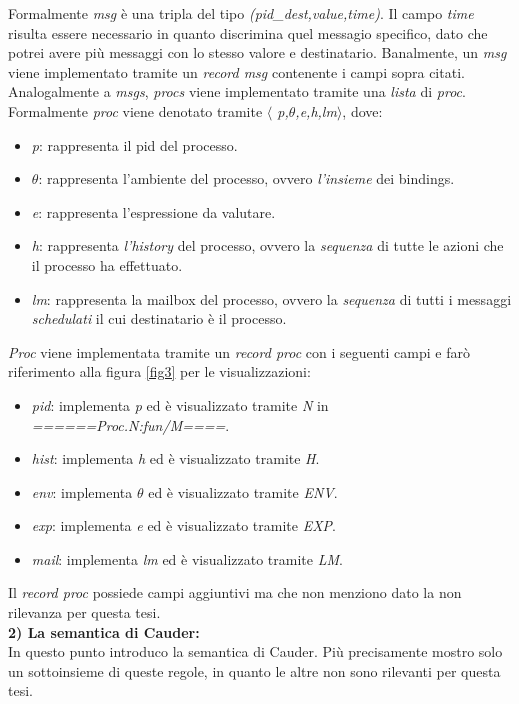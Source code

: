 \documentclass[background.tex]{subfiles}
\begin{document}
Formalmente \textit{msg} è una tripla del tipo \textit{(pid\_dest,value,time)}. Il campo \textit{time} risulta essere necessario in quanto discrimina quel messagio specifico, dato che potrei avere più messaggi con lo stesso valore e destinatario.
Banalmente, un \textit{msg} viene implementato tramite un \textit{record msg} contenente i campi sopra citati.
Analogalmente a \textit{msgs}, \textit{procs} viene implementato tramite una \textit{lista} di \textit{proc}.
Formalmente \textit{proc} viene denotato tramite \textit{$\langle$ p,$\theta$,e,h,lm$\rangle$}, dove:
	\begin{itemize}
		\item \textit{p}: rappresenta il pid del processo.
		\item \textit{$\theta$}: rappresenta l'ambiente del processo, ovvero \textit{l'insieme} dei bindings.
		\item \textit{e}: rappresenta l'espressione da valutare.
		\item \textit{h}: rappresenta \textit{l'history} del processo, ovvero la \textit{sequenza} di tutte le azioni che il processo ha effettuato.
		\item \textit{lm}: rappresenta la mailbox del processo, ovvero la \textit{sequenza} di tutti i messaggi \textit{schedulati} il cui destinatario è il processo.
	\end{itemize}
\textit{Proc} viene implementata tramite un \textit{record proc} con i seguenti campi e farò riferimento alla figura \ref{fig3} per le visualizzazioni:
	\begin{itemize}
		\item \textit{pid}: implementa \textit{p} ed è visualizzato tramite \textit{N} in\\ \textit{======Proc.N:fun/M====}.
		\item \textit{hist}: implementa \textit{h} ed è visualizzato tramite \textit{H}.
		\item \textit{env}: implementa \textit{$\theta$} ed è visualizzato tramite \textit{ENV}.
		\item \textit{exp}: implementa \textit{e} ed è visualizzato tramite \textit{EXP}.
		\item \textit{mail}: implementa \textit{lm} ed è visualizzato tramite \textit{LM}.
	\end{itemize}
	Il \textit{record proc} possiede campi aggiuntivi ma che non menziono dato la non rilevanza per questa tesi.\\
\textbf{2) La semantica di Cauder:}\\
In questo punto introduco la semantica di Cauder. Più precisamente mostro solo un sottoinsieme di queste regole, in quanto le altre non sono rilevanti per questa tesi.
\end{document}
